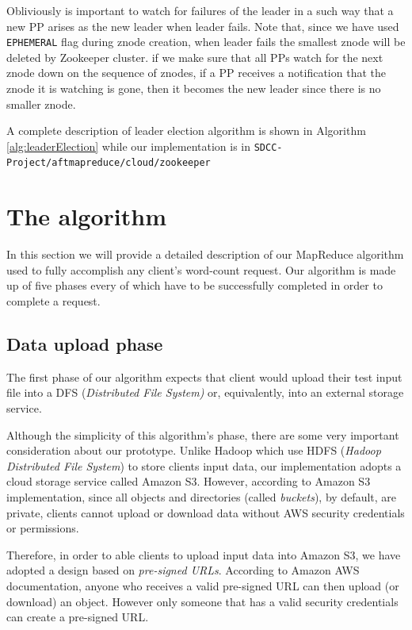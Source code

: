 \documentclass[sigchi]{acmart}
\begin{document}
Obliviously is important to watch for failures of the leader in a such way that a new PP arises as the new leader when leader fails. Note that, since we have used \texttt{EPHEMERAL} flag during znode creation, when leader fails the smallest znode will be deleted by Zookeeper cluster. if we make sure that all PPs watch for the next znode down on the sequence of znodes, if a PP receives a notification that the znode it is watching is gone, then it becomes the new leader since there is no smaller znode. 

A complete description of leader election algorithm is shown in Algorithm \ref{alg:leaderElection} while our implementation is in \texttt{SDCC-Project/aftmapreduce/cloud/zookeeper}

\section{The algorithm}

In this section we will provide a detailed description of our MapReduce algorithm used to fully accomplish any client's word-count request. Our algorithm is made up of five phases every of which have to be successfully completed in order to complete a request.

\subsection{Data upload phase}

The first phase of our algorithm expects that client would upload their test input file into a DFS (\textit{Distributed File System)} or, equivalently, into an external storage service.

Although the simplicity of this algorithm's phase, there are some very important consideration about our prototype. Unlike Hadoop which use HDFS (\textit{Hadoop Distributed File System}) to store clients input data, our implementation adopts a cloud storage service called Amazon S3. However, according to Amazon S3 implementation, since all objects and directories (called \textit{buckets}), by default, are private, clients cannot upload or download data without AWS security credentials or permissions.

Therefore, in order to able clients to upload input data into Amazon S3, we have adopted a design based on \textit{pre-signed URLs}. According to Amazon AWS documentation, anyone who receives a valid pre-signed URL can then upload (or download) an object. However only someone that has a valid security credentials can create a pre-signed URL. 
\end{document}
